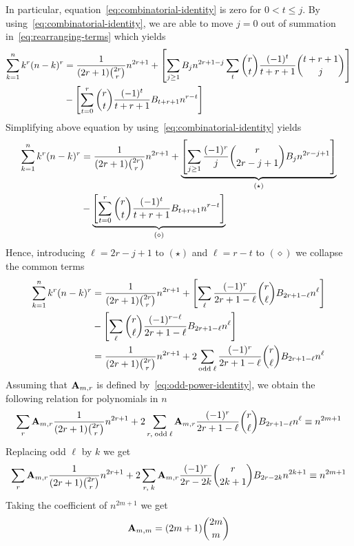 In particular, equation~\eqref{eq:combinatorial-identity} is zero for $0< t \leq j$.
By using~\eqref{eq:combinatorial-identity}, we are able to move $j=0$ out of summation
in~\eqref{eq:rearranging-terms} which yields
\begin{equation*}
    \begin{split}
        \sum_{k=1}^{n} k^{r} (n-k)^{r}
        &= \frac{1}{(2r+1) \binom{2r}r} n^{2r+1} + \left[ \sum_{j \geq 1} {B}\sb{j} n^{2r+1-j} \sum_{t} \binom{r}{t} \frac{(-1)^t}{t+r+1} \binom{t+r+1}{j} \right] \\
        &- \left[ \sum_{t=0}^{r} \binom{r}{t} \frac{(-1)^t}{t+r+1} {B}\sb{t+r+1} n^{r-t} \right]
    \end{split}
\end{equation*}
Simplifying above equation by using~\eqref{eq:combinatorial-identity} yields
\begin{equation*}
    \begin{split}
        \sum_{k=1}^{n} k^{r} (n-k)^{r}
        &= \frac{1}{(2r+1) \binom{2r}r} n^{2r+1}
        + \underbrace{\left[ \sum_{j \geq 1} \frac{(-1)^r}{j} \binom{r}{2r-j+1} {B}\sb{j} n^{2r-j+1} \right]}_{(\star)} \\
        &- \underbrace{\left[ \sum_{t=0}^{r} \binom{r}{t} \frac{(-1)^t}{t+r+1} {B}\sb{t+r+1} n^{r-t} \right]}_{(\diamond)}
    \end{split}
\end{equation*}
Hence, introducing $\ell=2r-j+1$ to $(\star)$ and $\ell=r-t$ to $(\diamond)$
we collapse the common terms
\begin{equation*}
    \begin{split}
        \sum_{k=1}^{n} k^{r} (n-k)^{r}
        &= \frac{1}{(2r+1) \binom{2r}r} n^{2r+1}
        + \left[ \sum_{\ell} \frac{(-1)^r}{2r+1-\ell} \binom{r}{\ell} {B}\sb{2r+1-\ell} n^{\ell} \right] \\
        &- \left[ \sum_{\ell} \binom{r}{\ell} \frac{(-1)^{r-\ell}}{2r+1-\ell} {B}\sb{2r+1-\ell} n^{\ell} \right]\\
        &= \frac{1}{(2r+1) \binom{2r}r} n^{2r+1} + 2 \sum_{\mathrm{odd \; \ell}} \frac{(-1)^r}{2r+1-\ell} \binom{r}{\ell} {B}\sb{2r+1-\ell} n^{\ell}
    \end{split}
\end{equation*}
Assuming that ${\mathbf{A}} \sb{m,r}$ is defined by~\eqref{eq:odd-power-identity},
we obtain the following relation for polynomials in $n$
\begin{equation*}
    \sum_{r} {\mathbf{A}} \sb{m,r} \frac{1}{(2r+1) \binom{2r}r} n^{2r+1}
    + 2 \sum_{r, \; \mathrm{odd \; \ell}} {\mathbf{A}} \sb{m,r} \frac{(-1)^r}{2r+1-\ell} \binom{r}{\ell} {B}\sb{2r+1-\ell} n^{\ell}
    \equiv n^{2m+1}
\end{equation*}
Replacing odd $\ell$ by $k$ we get
\begin{align*}
    \sum_{r} {\mathbf{A}} \sb{m,r} \frac{1}{(2r+1) \binom{2r}r} n^{2r+1}
    + 2 \sum_{r, \; k} {\mathbf{A}} \sb{m,r} \frac{(-1)^r}{2r-2k} \binom{r}{2k+1} {B}\sb{2r-2k} n^{2k+1} \equiv n^{2m+1}
\end{align*}
Taking the coefficient of $n^{2m+1}$ we get
\begin{equation*}
    {\mathbf{A}} \sb{m,m} = (2m+1)\binom{2m}{m}
\end{equation*}

